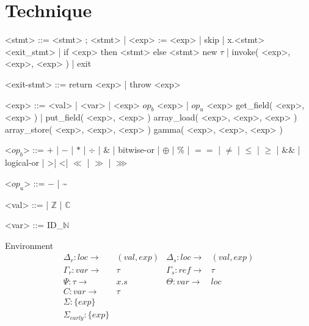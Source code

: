 \section{Technique}
%
\begin{grammar}
<stmt> ::= <stmt> ; <stmt> | <exp> := <exp> | skip | x.<stmt> 
\alt <exit_stmt> | if <exp> then <stmt> else <stmt> 
\alt new $\tau$ | invoke( <exp>, <exp>, <exp> )  | exit

<exit-stmt> ::=  return <exp> |  throw <exp> 

<exp>  ::= <val> | <var> | <exp> $op_b$ <exp> | $op_u$ <exp>
\alt get_field( <exp>, <exp> ) | put_field( <exp>, <exp> )
\alt array_load( <exp>, <exp>, <exp> )  
\alt array_store( <exp>, <exp>, <exp> ) 
\alt gamma( <exp>, <exp>, <exp> ) 

<$op_b$> ::= $+$ | $-$ | $*$ | $\div$ | \& | bitwise-or | $\oplus$ | \% | $==$ | $\neq$ | $\leq$ | $\geq$ | \&\& | logical-or | \textgreater | \textless | $\ll$ | $\gg$ | $\ggg$

<$op_u$> ::= $-$ | \textasciitilde

<val> ::= \unit | $\mathbb{Z}$ |  $\mathbb{C}$

<var> ::= ID_$\mathbb{N}$
\end{grammar}

Environment
$$
\begin{array}{llll}
\Delta_r: loc \rightarrow & ( val, exp) &  \Delta_s: loc \rightarrow & ( val, exp)
\\
\Gamma_r: var \rightarrow & \tau &  \Gamma_s: ref \rightarrow & \tau
\\
\Psi: \tau \rightarrow & x.s &  \Theta: var \rightarrow & loc
\\
C: var \rightarrow & \tau & &
\\
\Sigma: \{exp\} &  &  & 
\\
\Sigma_{early}: \{exp\} &  &  & 
\end{array}
$$

